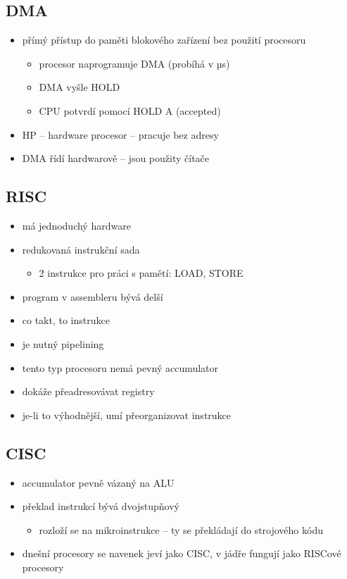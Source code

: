 \documentclass[a4paper,12pt]{article}
\providecommand{\tightlist}{%
\setlength{\itemsep}{0pt}\setlength{\parskip}{0pt}}
\begin{document}
\subsection{DMA}

\begin{itemize}
\tightlist
\item přímý přístup do paměti blokového zařízení bez použití procesoru

  \begin{itemize}
  \tightlist
  \item procesor naprogramuje DMA (probíhá v µs)
  \item DMA vyšle HOLD
  \item CPU potvrdí pomocí HOLD A (accepted)
  \end{itemize}
\item HP -- hardware procesor -- pracuje bez adresy
\item DMA řídí hardwarově -- jsou použity čítače
\end{itemize}

\subsection{RISC}

\begin{itemize}
\tightlist
\item má jednoduchý hardware
\item redukovaná instrukční sada

  \begin{itemize}
  \tightlist
  \item 2 instrukce pro práci s pamětí: LOAD, STORE
  \end{itemize}
\item program v assembleru bývá delší
\item co takt, to instrukce
\item je nutný pipelining
\item tento typ procesoru nemá pevný accumulator
\item dokáže přeadresovávat registry
\item je-li to výhodnější, umí přeorganizovat instrukce
\end{itemize}

\subsection{CISC}

\begin{itemize}
\tightlist
\item accumulator pevně vázaný na ALU
\item překlad instrukcí bývá dvojstupňový

  \begin{itemize}
  \tightlist
  \item rozloží se na mikroinstrukce -- ty se překládají do strojového kódu
  \end{itemize}
\item dnešní procesory se navenek jeví jako CISC, v jádře fungují jako
  RISCové procesory
\end{itemize}
\end{document}
